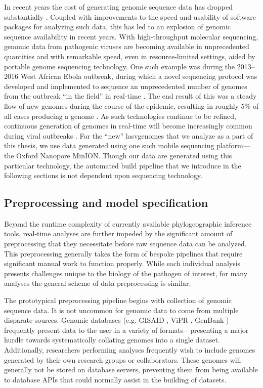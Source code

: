 In recent years the cost of generating genomic sequence data has dropped substantially \cite{sboner2011real}.
Coupled with improvements to the speed and usability of software packages for analyzing such data, this has led to an explosion of genomic sequence availability in recent years.
With high-throughput molecular sequencing, genomic data from pathogenic viruses are becoming available in unprecedented quantities and with remarkable speed, even in resource-limited settings, aided by portable genome sequencing technology.
One such example was during the 2013--2016 West African Ebola outbreak, during which a novel sequencing protocol was developed and implemented to sequence an unprecedented number of genomes from the outbreak ``in the field'' in real-time \cite{quick2016real}.
The end result of this was a steady flow of new genomes during the course of the epidemic, resulting in roughly 5\% of all cases producing a genome \cite{dudas2017virus}.
As such technologies continue to be refined, continuous generation of genomes in real-time will become increasingly common during viral outbreaks \cite{jain2016oxford}.
For the ``new'' \gls{lasv}genomes that we analyze as a part of this thesis, we use data generated using one such mobile sequencing platform---the Oxford Nanopore MinION.
Though our data are generated using this particular technology, the automated build pipeline that we introduce in the following sections is not dependent upon sequencing technology.

\subsection{Preprocessing and model specification}

Beyond the runtime complexity of currently available phylogeographic inference tools, real-time analyses are further impeded by the significant amount of preprocessing that they necessitate before raw sequence data can be analyzed.
This preprocessing generally takes the form of bespoke pipelines that require significant manual work to function properly.
While each individual analysis presents challenges unique to the biology of the pathogen of interest, for many analyses the general scheme of data preprocessing is similar.

The prototypical preprocessing pipeline begins with collection of genomic sequence data.
It is not uncommon for genomic data to come from multiple disparate sources.
Genomic databases (e.g. GISAID \cite{shu2017gisaid}, ViPR \cite{pickett2012vipr}, GenBank \cite{benson2012genbank}) frequently present data to the user in a variety of formats---presenting a major hurdle towards systematically collating genomes into a single dataset.
Additionally, researchers performing analyses frequently wish to include genomes generated by their own research groups or collaborators.
These genomes will generally not be stored on database servers, preventing them from being available to database APIs that could normally assist in the building of datasets.

